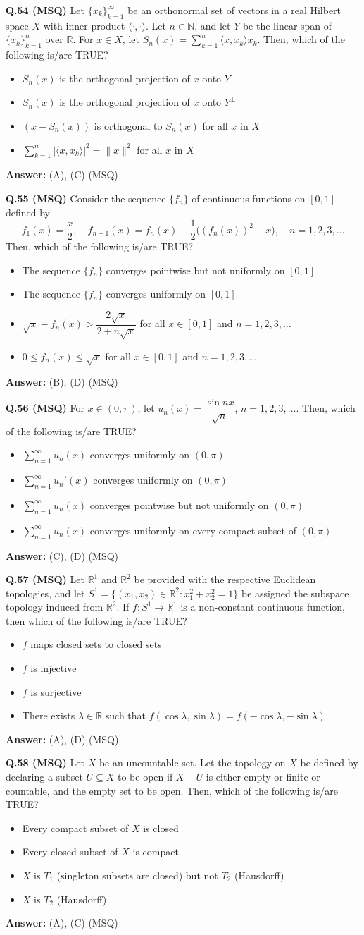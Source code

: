 \documentclass[11pt,a4paper]{article}
\newcommand{\optslistA}[4]{%
  \begin{itemize}
    \setlength{\itemsep}{2pt}\setlength{\parskip}{0pt}
    \item[(A)] #1
    \item[(B)] #2
    \item[(C)] #3
    \item[(D)] #4
  \end{itemize}%
}
\newcommand{\ans}[1]{\textbf{Answer:} #1\par\medskip}
\begin{document}
\textbf{Q.54 (MSQ)} Let $\{x_k\}_{k=1}^{\infty}$ be an orthonormal set of vectors in a real Hilbert space $X$ with inner product $\langle \cdot, \cdot \rangle$. Let $n \in \mathbb{N}$, and let $Y$ be the linear span of $\{x_k\}_{k=1}^{n}$ over $\mathbb{R}$. For $x \in X$, let $S_n(x) = \sum_{k=1}^{n} \langle x, x_k \rangle x_k$. Then, which of the following is/are TRUE?
\optslistA{$S_n(x)$ is the orthogonal projection of $x$ onto $Y$}{$S_n(x)$ is the orthogonal projection of $x$ onto $Y^\perp$}{$(x - S_n(x))$ is orthogonal to $S_n(x)$ for all $x$ in $X$}{$\sum_{k=1}^{n} |\langle x, x_k \rangle|^2 = \|x\|^2$ for all $x$ in $X$}
\ans{(A), (C) (MSQ)}

\textbf{Q.55 (MSQ)} Consider the sequence $\{f_n\}$ of continuous functions on $[0, 1]$ defined by
\[
  f_1(x) = \frac{x}{2}, \quad f_{n+1}(x) = f_n(x) - \frac{1}{2}\bigl((f_n(x))^2 - x\bigr), \quad n = 1, 2, 3, \ldots
\]
Then, which of the following is/are TRUE?
\optslistA{The sequence $\{f_n\}$ converges pointwise but not uniformly on $[0, 1]$}{The sequence $\{f_n\}$ converges uniformly on $[0, 1]$}{$\sqrt{x} - f_n(x) > \dfrac{2\sqrt{x}}{2 + n\sqrt{x}}$ for all $x \in [0, 1]$ and $n = 1, 2, 3, \ldots$}{$0 \le f_n(x) \le \sqrt{x}$ for all $x \in [0, 1]$ and $n = 1, 2, 3, \ldots$}
\ans{(B), (D) (MSQ)}

\textbf{Q.56 (MSQ)} For $x \in (0, \pi)$, let $u_n(x) = \dfrac{\sin nx}{\sqrt{n}}$, $n = 1, 2, 3, \ldots$. Then, which of the following is/are TRUE?
\optslistA{$\sum_{n=1}^{\infty} u_n(x)$ converges uniformly on $(0, \pi)$}{$\sum_{n=1}^{\infty} u_n'(x)$ converges uniformly on $(0, \pi)$}{$\sum_{n=1}^{\infty} u_n(x)$ converges pointwise but not uniformly on $(0, \pi)$}{$\sum_{n=1}^{\infty} u_n(x)$ converges uniformly on every compact subset of $(0, \pi)$}
\ans{(C), (D) (MSQ)}

\textbf{Q.57 (MSQ)} Let $\mathbb{R}^1$ and $\mathbb{R}^2$ be provided with the respective Euclidean topologies, and let $S^1 = \{(x_1, x_2) \in \mathbb{R}^2 : x_1^2 + x_2^2 = 1\}$ be assigned the subspace topology induced from $\mathbb{R}^2$. If $f : S^1 \to \mathbb{R}^1$ is a non-constant continuous function, then which of the following is/are TRUE?
\optslistA{$f$ maps closed sets to closed sets}{$f$ is injective}{$f$ is surjective}{There exists $\lambda \in \mathbb{R}$ such that $f(\cos\lambda, \sin\lambda) = f(-\cos\lambda, -\sin\lambda)$}
\ans{(A), (D) (MSQ)}

\textbf{Q.58 (MSQ)} Let $X$ be an uncountable set. Let the topology on $X$ be defined by declaring a subset $U \subseteq X$ to be open if $X - U$ is either empty or finite or countable, and the empty set to be open. Then, which of the following is/are TRUE?
\optslistA{Every compact subset of $X$ is closed}{Every closed subset of $X$ is compact}{$X$ is $T_1$ (singleton subsets are closed) but not $T_2$ (Hausdorff)}{$X$ is $T_2$ (Hausdorff)}
\ans{(A), (C) (MSQ)}
\end{document}
